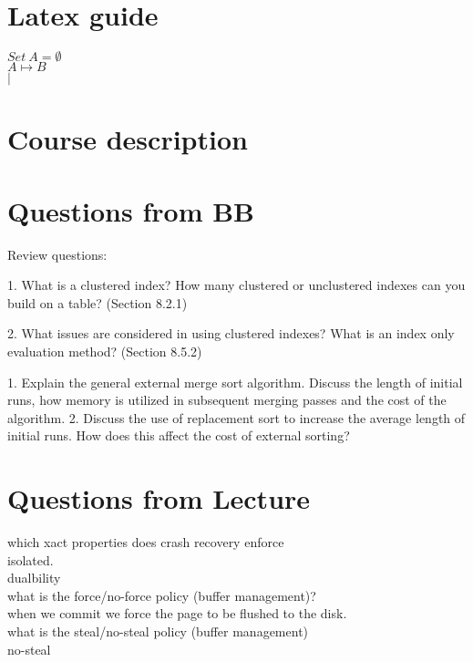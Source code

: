 \documentclass[a4paper,10pt,titlepage]{report}
\date{}
\begin{document}
\renewcommand{\thepage}{\roman{page}}%
\tableofcontents
\newpage
\setcounter{page}{1}
\renewcommand{\thepage}{\arabic{page}}
\section{Latex guide}
$
Set \ A = \emptyset 
$
\\
$
A \mapsto B
$
\\
$
\mid
$


\section{Course description}


\section{Questions from BB}
Review questions:

1. What is a clustered index? How many clustered or unclustered indexes can you build on a table? (Section 8.2.1)

2. What issues are considered in using clustered indexes? What is an index only evaluation method? (Section 8.5.2)

1. Explain the general external merge sort algorithm. Discuss the length of initial runs, how memory is utilized in subsequent merging passes and the cost of the algorithm.
2. Discuss the use of replacement sort to increase the average length of initial runs. How does this affect the cost of external sorting? 


\section{Questions from Lecture}
which xact properties does crash recovery enforce\\
\hspace{10mm}	isolated.\\
\hspace{10mm}	dualbility\\

what is the force/no-force policy (buffer management)?  \\
\hspace{10mm}	when we commit we force the page to be flushed to the disk. \\

what is the steal/no-steal policy (buffer management)\\
\hspace{10mm}	no-steal \\
		
\end{document}
